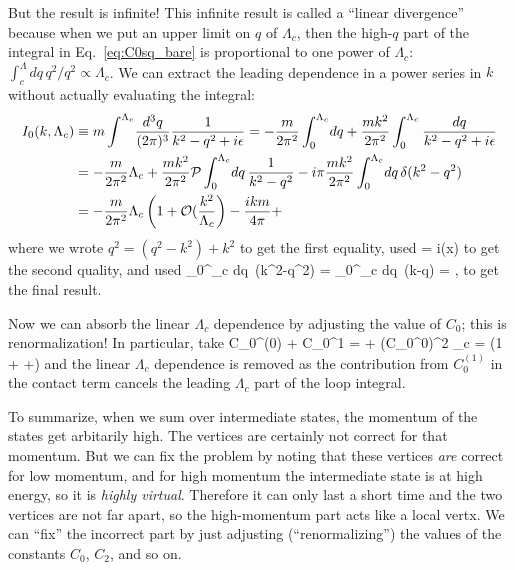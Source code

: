 But the result is infinite!
This infinite result is called a ``linear divergence'' because when we put an
upper limit on $q$ of $\Lambda_c$, then the high-$q$ part of the integral
in Eq.~\eqref{eq:C0sq_bare}
is proportional to one power of 
$\Lambda_c$: $\int^\Lambda_c\!dq \, q^2/q^2 \propto \Lambda_c$.  
We can extract the leading dependence in a power series in $k$ without
actually evaluating the integral:  
\begin{align}
 I_0(k,\Lambda_c) &\equiv m\int^{\Lambda_c}\! \frac{d^3q}{(2\pi)^3} \frac{1}{k^2-q^2 + i\epsilon}
 = -\frac{m}{2\pi^2} \int_{0}^{\Lambda_c}\! dq
   + \frac{m k^2}{2\pi^2} \int_0^{\Lambda_c} \frac{dq}{k^2-q^2+ i\epsilon}
 \nonumber \\
 &=   
     -\frac{m}{2\pi^2}\Lambda_c + \frac{m k^2}{2\pi^2}
     \mathcal{P}\int_0^{\Lambda_c}\! dq \, \frac{1}{k^2-q^2}
     - i\pi \frac{m k^2}{2\pi^2} \int_0^{\Lambda_c} \! dq \, \delta(k^2-q^2)
 \nonumber \\
 &=   
     -\frac{m}{2\pi^2}\Lambda_c \left(1 
     + {\cal O}(\frac{k^2}{\Lambda_c} \right)
     - \frac{ik m }{4\pi} +
     \label{eq:C0sq}
\end{align}
where we wrote $q^2 = (q^2 - k^2) + k^2$ to get the first equality,
used
\beq
   =  \mp i\pi\delta(x)
\eeq
to get the second quality, and used
\beq
  \int_0^{\Lambda_c}\! dq\, \delta(k^2-q^2)
    = \int_0^{\Lambda_c}\! dq\, \delta(k-q) = 
    \;,
\eeq
to get the final result.

Now we can absorb
the linear $\Lambda_c$ dependence by adjusting the value of $C_0$; this is renormalization!  In particular, take
\beq
  C_0^{(0)} + C_0^{1} = 
   + (C_0^{0})^2 \Lambda_c =
   \left(1 + +\cdots\right)
\eeq
and the linear $\Lambda_c$ dependence is removed as the contribution
from $C^{(1)}_0$ in the contact term cancels the leading $\Lambda_c$
part of the loop integral.


To summarize, when we sum over intermediate states, the momentum of the states get
arbitarily high.  The vertices are certainly not correct for that 
momentum.  But we can fix the problem by noting that these vertices
\emph{are} correct for low momentum, and for high momentum the
intermediate state is at high energy, so it is \emph{highly virtual}.
Therefore it can only last a short time and the two vertices are
not far apart, so the high-momentum part acts like a local vertx.
We can ``fix'' the incorrect part by just adjusting (``renormalizing'') the values
of the constants $C_0$, $C_2$, and so on.


